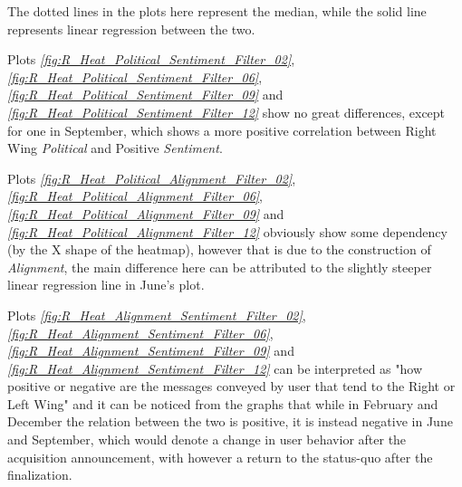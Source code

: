 \documentclass[twoside,twocolumn]{article}
\begin{document}
	The dotted lines in the plots here represent the median, while the solid line represents linear regression between the two.
	
	Plots \textit{\ref{fig:R_Heat_Political_Sentiment_Filter_02}}, \textit{\ref{fig:R_Heat_Political_Sentiment_Filter_06}}, \textit{\ref{fig:R_Heat_Political_Sentiment_Filter_09}} and \textit{\ref{fig:R_Heat_Political_Sentiment_Filter_12}} show no great differences, except for one in September, which shows a more positive correlation between Right Wing \textit{Political} and Positive \textit{Sentiment}.
	
	Plots \textit{\ref{fig:R_Heat_Political_Alignment_Filter_02}}, \textit{\ref{fig:R_Heat_Political_Alignment_Filter_06}}, \textit{\ref{fig:R_Heat_Political_Alignment_Filter_09}} and \textit{\ref{fig:R_Heat_Political_Alignment_Filter_12}} obviously show some dependency (by the X shape of the heatmap), however that is due to the construction of \textit{Alignment}, the main difference here can be attributed to the slightly steeper linear regression line in June's plot.
	
	Plots \textit{\ref{fig:R_Heat_Alignment_Sentiment_Filter_02}}, \textit{\ref{fig:R_Heat_Alignment_Sentiment_Filter_06}}, \textit{\ref{fig:R_Heat_Alignment_Sentiment_Filter_09}} and \textit{\ref{fig:R_Heat_Alignment_Sentiment_Filter_12}} can be interpreted as "how positive or negative are the messages conveyed by user that tend to the Right or Left Wing" and it can be noticed from the graphs that while in February and December the relation between the two is positive, it is instead negative in June and September, which would denote a change in user behavior after the acquisition announcement, with however a return to the status-quo after the finalization.
\end{document}
